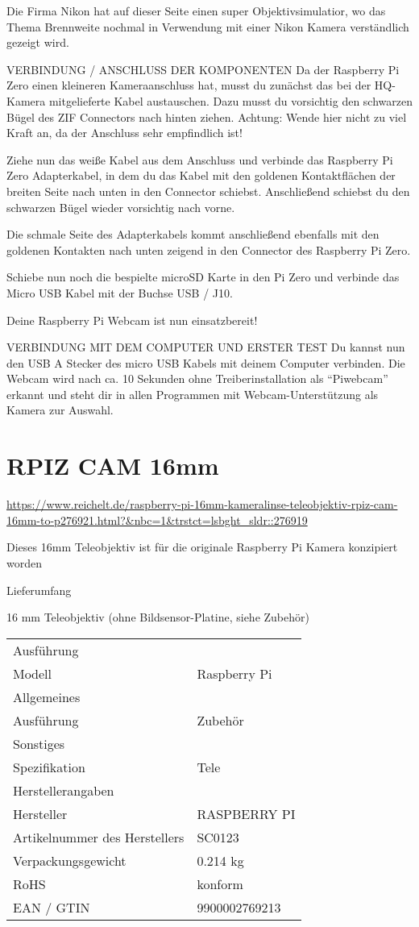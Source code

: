 Die Firma Nikon hat auf dieser Seite einen super Objektivsimulatior, wo das Thema Brennweite nochmal in Verwendung mit einer Nikon Kamera verständlich gezeigt wird.

VERBINDUNG / ANSCHLUSS DER KOMPONENTEN
Da der Raspberry Pi Zero einen kleineren Kameraanschluss hat, musst du zunächst das bei der HQ-Kamera mitgelieferte Kabel austauschen.
Dazu musst du vorsichtig den schwarzen Bügel des ZIF Connectors nach hinten ziehen.
Achtung: Wende hier nicht zu viel Kraft an, da der Anschluss sehr empfindlich ist!

Ziehe nun das weiße Kabel aus dem Anschluss und verbinde das Raspberry Pi Zero Adapterkabel, in dem du das Kabel mit den goldenen Kontaktflächen der breiten Seite nach unten in den Connector schiebst. Anschließend schiebst du den schwarzen Bügel wieder vorsichtig nach vorne.

Die schmale Seite des Adapterkabels kommt anschließend ebenfalls mit den goldenen Kontakten nach unten zeigend in den Connector des Raspberry Pi Zero.

Schiebe nun noch die bespielte microSD Karte in den Pi Zero und verbinde das Micro USB Kabel mit der Buchse USB / J10.

Deine Raspberry Pi Webcam ist nun einsatzbereit!

VERBINDUNG MIT DEM COMPUTER UND ERSTER TEST
Du kannst nun den USB A Stecker des micro USB Kabels mit deinem Computer verbinden. Die Webcam wird nach ca. 10 Sekunden ohne Treiberinstallation als “Piwebcam” erkannt und steht dir in allen Programmen mit Webcam-Unterstützung als Kamera zur Auswahl.
\chapter{RPIZ CAM 16mm}

\url{https://www.reichelt.de/raspberry-pi-16mm-kameralinse-teleobjektiv-rpiz-cam-16mm-to-p276921.html?&nbc=1&trstct=lsbght_sldr::276919}



Dieses 16mm Teleobjektiv ist für die originale Raspberry Pi Kamera konzipiert worden



Lieferumfang

16 mm Teleobjektiv (ohne Bildsensor-Platine, siehe Zubehör)


\begin{tabular}{ll}
Ausführung &\\
Modell     &  Raspberry Pi \\
Allgemeines & \\
Ausführung  &  Zubehör \\
Sonstiges & \\
Spezifikation  & Tele \\
Herstellerangaben & \\
Hersteller &  RASPBERRY PI \\
Artikelnummer des Herstellers  & SC0123 \\
Verpackungsgewicht &  0.214 kg \\
RoHS &  konform \\
EAN / GTIN &  9900002769213 \\
\end{tabular}

